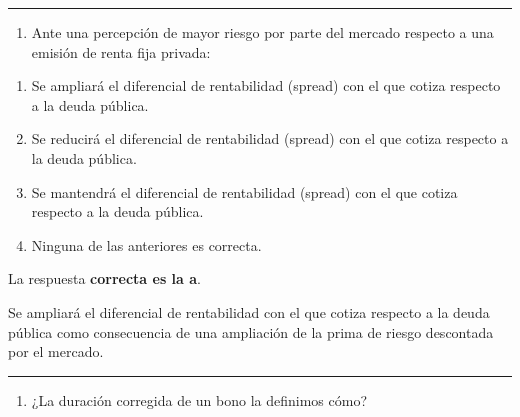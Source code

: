 \documentclass[
  letterpaper,
  DIV=11,
  numbers=noendperiod]{scrartcl}
\providecommand{\tightlist}{%
  \setlength{\itemsep}{0pt}\setlength{\parskip}{0pt}}\usepackage{longtable,booktabs,array}
\begin{document}
\begin{center}\rule{0.5\linewidth}{0.5pt}\end{center}

\begin{enumerate}
\def\labelenumi{\arabic{enumi}.}
\setcounter{enumi}{16}
\tightlist
\item
  Ante una percepción de mayor riesgo por parte del mercado respecto a
  una emisión de renta fija privada:
\end{enumerate}

\begin{enumerate}
\def\labelenumi{\alph{enumi}.}
\item
  Se ampliará el diferencial de rentabilidad (spread) con el que cotiza
  respecto a la deuda pública.
\item
  Se reducirá el diferencial de rentabilidad (spread) con el que cotiza
  respecto a la deuda pública.
\item
  Se mantendrá el diferencial de rentabilidad (spread) con el que cotiza
  respecto a la deuda pública.
\item
  Ninguna de las anteriores es correcta.
\end{enumerate}

\begin{tcolorbox}[enhanced jigsaw, colframe=quarto-callout-note-color-frame, opacityback=0, colback=white, leftrule=.75mm, left=2mm, breakable, arc=.35mm, rightrule=.15mm, toprule=.15mm, bottomrule=.15mm]
\begin{minipage}[t]{5.5mm}
\textcolor{quarto-callout-note-color}{\faInfo}
\end{minipage}%
\begin{minipage}[t]{\textwidth - 5.5mm}

La respuesta \textbf{correcta es la a}.

Se ampliará el diferencial de rentabilidad con el que cotiza respecto a
la deuda pública como consecuencia de una ampliación de la prima de
riesgo descontada por el mercado.

\end{minipage}%
\end{tcolorbox}

\begin{center}\rule{0.5\linewidth}{0.5pt}\end{center}

\begin{enumerate}
\def\labelenumi{\arabic{enumi}.}
\setcounter{enumi}{17}
\tightlist
\item
  ¿La duración corregida de un bono la definimos cómo?
\end{enumerate}
\end{document}

